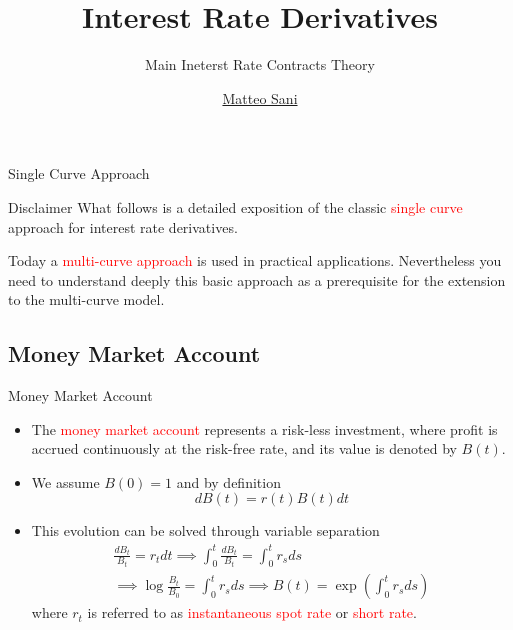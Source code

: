 \documentclass{beamer}
\title{Interest Rate Derivatives}
\subtitle{Main Ineterst Rate Contracts Theory}
\author{\href{mailto:matteo.sani@unisi.it}{Matteo Sani}}
\begin{document}
\begin{frame}[plain]
  \maketitle
\end{frame}

\begin{frame}{Single Curve Approach}
	\begin{block}{Disclaimer}
	What follows is a detailed exposition of the classic \textcolor{red}{single curve}
	approach for interest rate derivatives. 
	
	Today a \textcolor{red}{multi-curve approach} is
	used in practical applications. Nevertheless you need to understand
	deeply this basic approach as a prerequisite for the extension to the
	multi-curve model.
	\end{block}
\end{frame}  

\subsection{Money Market Account}
\begin{frame}{Money Market Account}
	\begin{itemize}
		\item<0-> The \textcolor{red}{money market account} represents a risk-less investment, where profit is accrued continuously at the risk-free rate, and its value is denoted by $B(t)$.
		\item<1-> We assume $B(0)=1$ and by definition
		\begin{equation}
			dB(t) = r(t)B(t)dt
		\end{equation}
		\item<2-> This evolution can be solved through variable separation
		\begin{equation}
			\begin{gathered}
				\frac{dB_t}{B_t} = r_t dt \implies \int_0^t \frac{dB_t}{B_t} = \int_0^t r_s ds \\
				\implies \log\frac{B_t}{B_0} = \int_0^t r_s ds \implies \boxed{B(t) = \exp\left(\int_0^t r_s ds\right)}
			\end{gathered}
		\end{equation}
		where $r_t$ is referred to as \textcolor{red}{instantaneous spot rate} or \textcolor{red}{short rate}.
	\end{itemize}
\end{frame}
\end{document}

